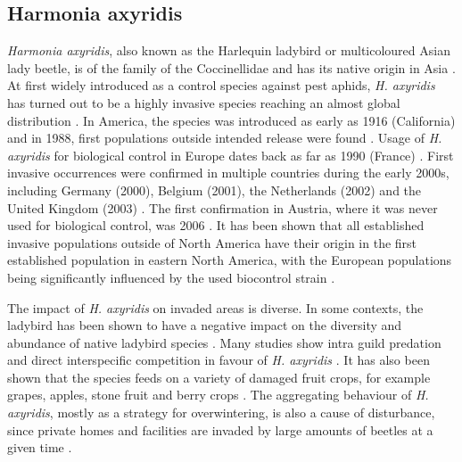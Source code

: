 \documentclass[12pt,a4paper]{article}
\begin{document}
\subsection{Harmonia axyridis}
\textit{Harmonia axyridis}, also known as the Harlequin ladybird or multicoloured Asian lady beetle, is of the family of the Coccinellidae and has its native origin in Asia \cite{roy2016harmonia}.
At first widely introduced as a control species against pest aphids, \textit{H. axyridis} has turned out to be a highly invasive species reaching an almost global distribution \cite{brown2008harmonia}.
In America, the species was introduced as early as 1916 (California) and in 1988, first populations outside intended release were found \cite{chapin1991harmoniaNA}.
Usage of \textit{H. axyridis} for biological control in Europe dates back as far as 1990 (France) \cite{coutanceau2006harmoniaFR}.
First invasive occurrences were confirmed in multiple countries during the early 2000s, including Germany (2000), Belgium (2001), the Netherlands (2002) and the United Kingdom (2003) \cite{roy2016harmonia}.
The first confirmation in Austria, where it was never used for biological control, was 2006 \cite{rabitsch2006harmoniaAT}.  
It has been shown that all established invasive populations outside of North America have their origin in the first established population in eastern North America, with the European populations being significantly influenced by the used biocontrol strain \cite{lombaert2010harmoniabridgehead}.

The impact of \textit{H. axyridis} on invaded areas is diverse.
In some contexts, the ladybird has been shown to have a negative impact on the diversity and abundance of native ladybird species \cite{roy2016harmonia}.
Many studies show intra guild predation and direct interspecific competition in favour of \textit{H. axyridis} \cite{pell2008harmoniaIGP}.
It has also been shown that the species feeds on a variety of damaged fruit crops, for example grapes, apples, stone fruit and berry crops \cite{koch2004harmoniafoodcrop}.
The aggregating behaviour of \textit{H. axyridis}, mostly as a strategy for overwintering, is also a cause of disturbance, since private homes and facilities are invaded by large amounts of beetles at a given time \cite{nalepa2005harmoniahomes}.

\newpage
\printbibliography[]

\end{document}
